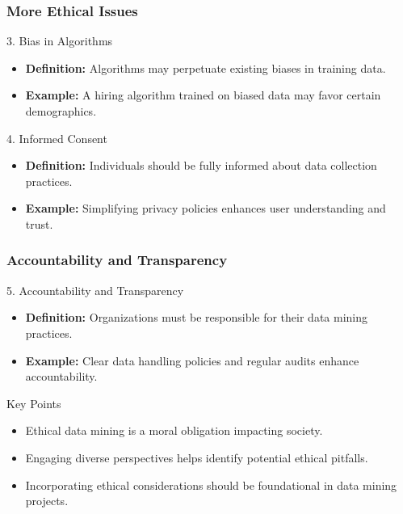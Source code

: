 \documentclass[aspectratio=169]{beamer}
\begin{document}
\begin{frame}[fragile]
    \frametitle{More Ethical Issues}
    \begin{block}{3. Bias in Algorithms}
        \begin{itemize}
            \item \textbf{Definition:} Algorithms may perpetuate existing biases in training data.
            \item \textbf{Example:} A hiring algorithm trained on biased data may favor certain demographics.
        \end{itemize}
    \end{block}

    \begin{block}{4. Informed Consent}
        \begin{itemize}
            \item \textbf{Definition:} Individuals should be fully informed about data collection practices.
            \item \textbf{Example:} Simplifying privacy policies enhances user understanding and trust.
        \end{itemize}
    \end{block}
\end{frame}

\begin{frame}[fragile]
    \frametitle{Accountability and Transparency}
    \begin{block}{5. Accountability and Transparency}
        \begin{itemize}
            \item \textbf{Definition:} Organizations must be responsible for their data mining practices.
            \item \textbf{Example:} Clear data handling policies and regular audits enhance accountability.
        \end{itemize}
    \end{block}

    \begin{block}{Key Points}
        \begin{itemize}
            \item Ethical data mining is a moral obligation impacting society.
            \item Engaging diverse perspectives helps identify potential ethical pitfalls.
            \item Incorporating ethical considerations should be foundational in data mining projects.
        \end{itemize}
    \end{block}
\end{frame}
\end{document}
